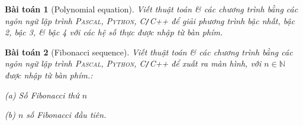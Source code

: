 \documentclass{article}
\numberwithin{equation}{section}
\newtheorem{baitoan}{Bài toán}[section]
\begin{document}
\begin{baitoan}[Polynomial equation]
	Viết thuật toán \& các chương trình bằng các ngôn ngữ lập trình \textsc{Pascal, Python, C\texttt{/}C++} để giải phương trình bậc nhất, bậc 2, bậc 3, \& bậc 4 với các hệ số thực được nhập từ bàn phím.
\end{baitoan}

\begin{baitoan}[Fibonacci sequence]
	Viết thuật toán \& các chương trình bằng các ngôn ngữ lập trình \textsc{Pascal, Python, C\texttt{/}C++} để xuất ra màn hình, với $n\in\mathbb{N}$ được nhập từ bàn phím.:
	\begin{enumerate*}
		\item[(a)] Số Fibonacci thứ $n$ 
		\item[(b)] $n$ số Fibonacci đầu tiên.
	\end{enumerate*}
\end{baitoan}


\printbibliography[heading=bibintoc]
	
\end{document}
